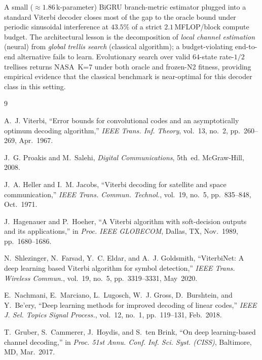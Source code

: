 \documentclass[conference]{IEEEtran}
\begin{document}
A small ($\approx 1.86$\,k-parameter) BiGRU branch-metric estimator
plugged into a standard Viterbi decoder closes most of the gap to the
oracle bound under periodic sinusoidal interference at $43.5\%$ of a
strict $2.1$\,MFLOP/block compute budget.  The architectural lesson is
the decomposition of \emph{local channel estimation} (neural) from
\emph{global trellis search} (classical algorithm); a budget-violating
end-to-end alternative fails to learn.  Evolutionary search over valid
$64$-state rate-$1/2$ trellises returns NASA~K=7 under both oracle and
frozen-N2 fitness, providing empirical evidence that the classical
benchmark is near-optimal for this decoder class in this setting.


\begin{thebibliography}{9}

A.~J. Viterbi,
``Error bounds for convolutional codes and an asymptotically optimum decoding
algorithm,''
\emph{IEEE Trans. Inf. Theory}, vol.~13, no.~2, pp.~260--269, Apr.~1967.

J.~G. Proakis and M.~Salehi,
\emph{Digital Communications}, 5th~ed.
McGraw-Hill, 2008.

J.~A. Heller and I.~M. Jacobs,
``Viterbi decoding for satellite and space communication,''
\emph{IEEE Trans. Commun. Technol.}, vol.~19, no.~5, pp.~835--848, Oct.~1971.

J.~Hagenauer and P.~Hoeher,
``A Viterbi algorithm with soft-decision outputs and its applications,''
in \emph{Proc. IEEE GLOBECOM}, Dallas, TX, Nov.~1989, pp.~1680--1686.

N.~Shlezinger, N.~Farsad, Y.~C. Eldar, and A.~J. Goldsmith,
``ViterbiNet: A deep learning based Viterbi algorithm for symbol detection,''
\emph{IEEE Trans. Wireless Commun.}, vol.~19, no.~5, pp.~3319--3331, May~2020.

E.~Nachmani, E.~Marciano, L.~Lugosch, W.~J. Gross, D.~Burshtein, and Y.~Be'ery,
``Deep learning methods for improved decoding of linear codes,''
\emph{IEEE J. Sel. Topics Signal Process.}, vol.~12, no.~1, pp.~119--131, Feb.~2018.

T.~Gruber, S.~Cammerer, J.~Hoydis, and S.~ten Brink,
``On deep learning-based channel decoding,''
in \emph{Proc. 51st Annu. Conf. Inf. Sci. Syst. (CISS)}, Baltimore, MD,
Mar.~2017.


\end{thebibliography}
\end{document}
